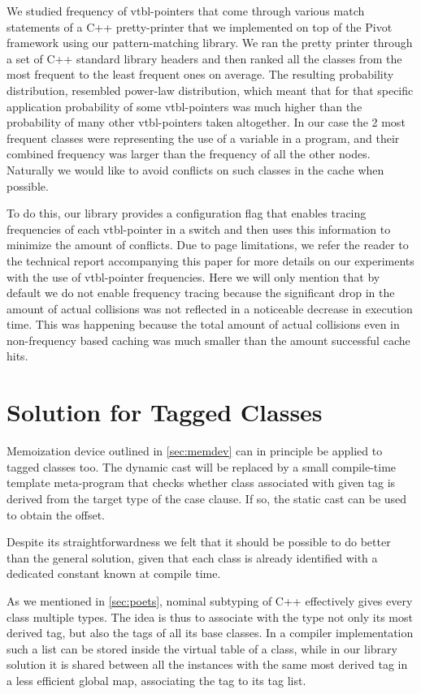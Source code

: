 \documentclass[preprint]{sigplanconf}
\begin{document}
We studied frequency of vtbl-pointers that come through various match statements
of a C++ pretty-printer that we implemented on top of the Pivot 
framework\cite{Pivot09} using our pattern-matching library. We ran the pretty 
printer through a set of C++ standard library headers and then ranked all the 
classes from the most frequent to the least frequent ones on average. The 
resulting probability distribution, resembled power-law distribution, which meant 
that for that specific application probability of some vtbl-pointers was much 
higher than the probability of many other vtbl-pointers taken altogether. In 
our case the 2 most frequent classes were representing the use of a variable in 
a program, and their combined frequency was larger than the frequency of all the 
other nodes. Naturally we would like to avoid conflicts on such classes in the 
cache when possible.

To do this, our library provides a configuration flag that enables tracing 
frequencies of each vtbl-pointer in a switch and then uses this information to 
minimize the amount of conflicts. Due to page limitations, we refer the reader 
to the technical report accompanying this paper for more details on our 
experiments with the use of vtbl-pointer frequencies\cite{TR}. Here we will only 
mention that by default we do not enable frequency tracing because the 
significant drop in the amount of actual collisions was not reflected in a 
noticeable decrease in execution time. This was happening because the total 
amount of actual collisions even in non-frequency based caching was much smaller 
than the amount successful cache hits.

\section{Solution for Tagged Classes}
\label{sec:cotc}

Memoization device outlined in \textsection\ref{sec:memdev} can in principle be 
applied to tagged classes too. The dynamic cast will be replaced by a small 
compile-time template meta-program that checks whether class associated with 
given tag is derived from the target type of the case clause. If so, the static 
cast can be used to obtain the offset.

Despite its straightforwardness we felt that it should be possible to do better 
than the general solution, given that each class is already identified with a 
dedicated constant known at compile time.

As we mentioned in \textsection\ref{sec:poets}, nominal subtyping of C++ 
effectively gives every class multiple types. The idea is thus to associate with 
the type not only its most derived tag, but also the tags of all its base classes.
In a compiler implementation such a list can be stored inside the virtual table 
of a class, while in our library solution it is shared between all the instances 
with the same most derived tag in a less efficient global map, associating the 
tag to its tag list.
\end{document}
